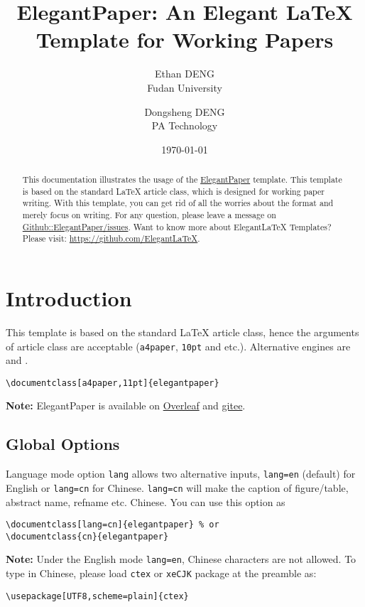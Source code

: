 \documentclass[11pt,en,authoryear]{elegantpaper}
\title{ElegantPaper: An Elegant \LaTeX{} Template for Working Papers}
\author{Ethan DENG \\ Fudan University \and Dongsheng DENG \\ PA Technology}
\institute{\href{https://github.com/ElegantLaTeX}{Elegant\LaTeX{} Program}}
\date{\today}
\begin{document}
\maketitle

\begin{abstract}
This documentation illustrates the usage of the \href{https://github.com/ElegantLaTeX/ElegantPaper}{ElegantPaper} template. This template is based on the standard \LaTeX{} article class, which is designed for working paper writing. With this template, you can get rid of all the worries about the format and merely focus on writing. For any question, please leave a message on \href{https://github.com/ElegantLaTeX/ElegantPaper/issues}{Github::ElegantPaper/issues}. Want to know more about Elegant\LaTeX{} Templates? Please visit: \href{https://github.com/ElegantLaTeX}{https://github.com/ElegantLaTeX}.\par
{}
\end{abstract}


\section{Introduction}

This template is based on the standard \LaTeX{} article class, hence the arguments of article class are acceptable (\lstinline{a4paper}, \lstinline{10pt} and etc.). Alternative engines are  and .

\begin{lstlisting}
\documentclass[a4paper,11pt]{elegantpaper}
\end{lstlisting}
\textbf{Note:} ElegantPaper is available on  \href{https://www.overleaf.com/latex/templates/elegantpaper-template/yzghrqjhmmmr}{Overleaf} and \href{https://gitee.com/ElegantLaTeX/ElegantPaper}{gitee}.

\subsection{Global Options}
Language mode option \lstinline{lang} allows two alternative inputs, \lstinline{lang=en} (default)  for English or \lstinline{lang=cn} for Chinese. \lstinline{lang=cn} will make the caption of figure/table, abstract name, refname etc. Chinese. You can use this option as
\begin{lstlisting}
\documentclass[lang=cn]{elegantpaper} % or
\documentclass{cn}{elegantpaper} 
\end{lstlisting}
\textbf{Note:} Under the English mode \lstinline{lang=en}, Chinese characters are not allowed. To type in Chinese, please load  \lstinline{ctex} or \lstinline{xeCJK} package at the preamble as:
\begin{lstlisting}
\usepackage[UTF8,scheme=plain]{ctex}
\end{lstlisting}
\end{document}

